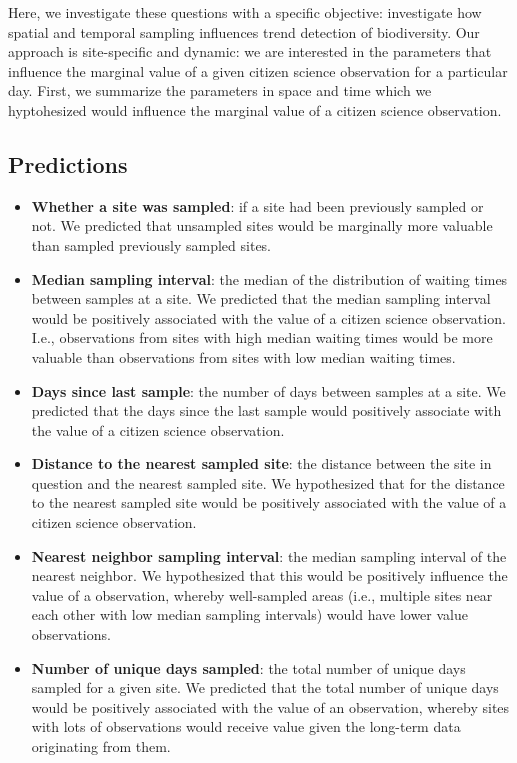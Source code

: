\documentclass[9pt,twocolumn,twoside,lineno]{pnas-new}
\begin{document}
Here, we investigate these questions with a specific objective: investigate how spatial and temporal sampling influences trend detection of biodiversity. Our approach is site-specific and dynamic: we are interested in the parameters that influence the marginal value of a given citizen science observation for a particular day. First, we summarize the parameters in space and time which we hyptohesized would influence the marginal value of a citizen science observation.

\subsection*{Predictions}

\begin{itemize}
  \item \textbf{Whether a site was sampled}: if a site had been previously sampled or not. We predicted that unsampled sites would be marginally more valuable than sampled previously sampled sites.
  \item \textbf{Median sampling interval}: the median of the distribution of waiting times between samples at a site. We predicted that the median sampling interval would be positively associated with the value of a citizen science observation. I.e., observations from sites with high median waiting times would be more valuable than observations from sites with low median waiting times.
  \item \textbf{Days since last sample}: the number of days between samples at a site. We predicted that the days since the last sample would positively associate with the value of a citizen science observation.
  \item \textbf{Distance to the nearest sampled site}: the distance between the site in question and the nearest sampled site. We hypothesized that for the distance to the nearest sampled site would be positively associated with the value of a citizen science observation.
  \item \textbf{Nearest neighbor sampling interval}: the median sampling interval of the nearest neighbor. We hypothesized that this would be positively influence the value of a observation, whereby well-sampled areas (i.e., multiple sites near each other with low median sampling intervals) would have lower value observations.
  \item \textbf{Number of unique days sampled}: the total number of unique days sampled for a given site. We predicted that the total number of unique days would be positively associated with the value of an observation, whereby sites with lots of observations would receive value given the long-term data originating from them.
\end{itemize}
\end{document}
